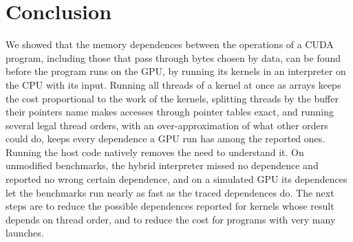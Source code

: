 \documentclass[11pt]{article}
\begin{document}
\section{Conclusion}
\label{sec:conclusion}

We showed that the memory dependences between the operations of a CUDA program, including those that pass through
bytes chosen by data, can be found before the program runs on the GPU, by running its kernels in an interpreter on
the CPU with its input. Running all threads of a kernel at once as arrays keeps the cost proportional to the work of
the kernels, splitting threads by the buffer their pointers name makes accesses through pointer tables exact, and
running several legal thread orders, with an over-approximation of what other orders could do, keeps every
dependence a GPU run has among the reported ones. Running the host code natively removes the need to understand
it. On \numBenchHyDone{} unmodified benchmarks, the hybrid interpreter missed no dependence and reported no wrong
certain dependence, and on a simulated GPU its dependences let the benchmarks run nearly as fast as the
traced dependences do. The next steps are to reduce the possible dependences reported for kernels whose result depends
on thread order, and to reduce the cost for programs with very many launches.



\end{document}
